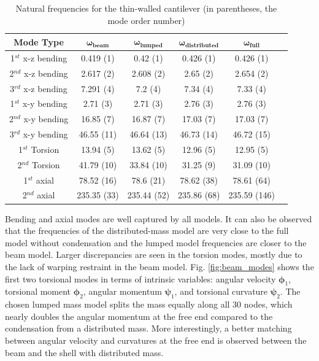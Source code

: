 \documentclass[11pt]{article}
\begin{document}
\begin{table}[h!]
\begin{center}
\caption{Natural frequencies for the thin-walled cantilever (in  parentheses, the mode order number)}
\label{table:frequencies_beam}
\begin{tabular}{c c c c c c}
 \toprule
\textbf{Mode Type}  & $ \pmb{\omega_{beam}}$  &$\pmb{\omega_{lumped}} $ &  $\pmb{\omega_{distributed}}$ & $ \pmb{\omega_{full}}$ \\
\midrule
1$^{st}$ x-z bending & 0.419 (1)   & 0.42 (1) & 0.426 (1) & 0.426 (1) \\
2$^{nd}$ x-z bending & 2.617 (2)  & 2.608 (2)  & 2.65 (2) & 2.654 (2)\\
3$^{rd}$ x-z bending & 7.291 (4)   & 7.2 (4) & 7.34 (4) & 7.33 (4)\\
\midrule
1$^{st}$ x-y bending &  2.71 (3)   & 2.71 (3) & 2.76 (3) & 2.76 (3)\\
2$^{nd}$ x-y bending &  16.85 (7)  & 16.87 (7) & 17.03 (7) & 17.03 (7)\\
3$^{rd}$ x-y bending & 46.55 (11)   & 46.64 (13) & 46.73 (14) & 46.72 (15)\\
\midrule
1$^{st}$ Torsion &  13.94 (5) & 13.62 (5) & 12.96 (5) & 12.95 (5)  \\
2$^{nd}$ Torsion &  41.79 (10)& 33.84 (10) & 31.25 (9) &  31.09 (10)  \\
\midrule
1$^{st}$ axial & 78.52 (16)  & 78.6 (21) & 78.62 (38) & 78.61 (64)\\
2$^{nd}$ axial & 235.35 (33)  & 235.44 (52) & 235.86 (68)  &235.59 (146)\\
\bottomrule
\end{tabular}
\end{center}
\end{table}
%
Bending and axial modes are well captured by all models. It can also be observed that the frequencies of the distributed-mass model are very close to the full model without condensation and the lumped model frequencies are closer to the beam model. Larger discrepancies are seen in the torsion modes, mostly due to the lack of warping restraint in the beam model. Fig. \ref{fig:beam_modes} shows the first two torsional modes in terms of intrinsic variables: angular velocity $\pmb{\phi}_1$, torsional moment $\pmb{\phi}_2$, angular momentum $\pmb{\psi}_1$, and torsional curvature $\pmb{\psi}_2$. The chosen lumped mass model splits the mass equally along all 30 nodes, which  nearly doubles the angular momentum at the free end compared to the condensation from a distributed mass. More interestingly, a better matching between angular velocity and curvatures at the free end is observed between the beam and the shell with distributed mass.
\end{document}

